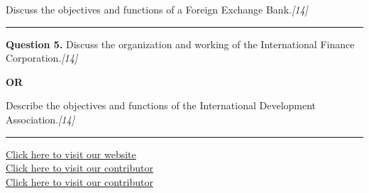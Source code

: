 \documentclass[11pt,a4paper]{article}
\newcommand{\pts}[1]{\hfill   \textit{[#1]}}
\begin{document}
Discuss the objectives and functions of a Foreign Exchange Bank.\pts{14}

\medskip\rule{\linewidth}{0.2pt}




\noindent   \textbf{Question 5.}
Discuss the organization and working of the International Finance Corporation.\pts{14}

\centerline{   \textbf{OR}}

Describe the objectives and functions of the International Development Association.\pts{14}

\vfill
\rule{\linewidth}{0.4pt}

\begin{center}\small
\href{https://bhu-exam.vercel.app/}{Click here to visit our website}\\[4pt]
\href{https://me-aryan.vercel.app/}{Click here to visit our contributor}\\[4pt]
\href{https://quashan-me.vercel.app/}{Click here to visit our contributor}
\end{center}
\end{document}
